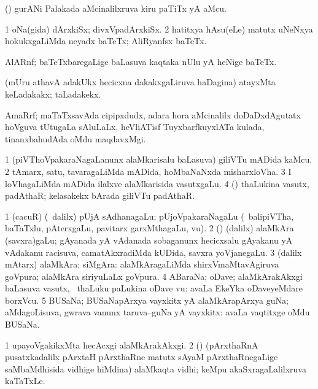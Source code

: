 \bentry
{}
\gl{\nA}
\bmng
(\vaMlAM) gurANi Palakada aMcinalilxruva kiru paTiTx yA aMcu. 
\emng
\eentry

\bentry
{}
\gl{\nA}
\bmng
\bnum
\num{1} oNa(gida) dArxkiSx; divxVpadArxkiSx. 
\num{2} hatitxya hAsu(eLe) matutx uNeNxya hokukxgaLiMda neyadx baTeTx; AliRyanfsx baTeTx. 
\enum
\emng
\eentry

\bentry
{}
\gl{\nA}
\expl{\P}
\bmng
AlARnf; baTeTxbaregaLige baLasuva kaqtaka nUlu yA heNige baTeTx. 
\emng
\eentry

\bentry
{}
\gl{\nA}
\bmng
(mUru athavA adakUkx hecicxna dakakxgaLiruva haDagina) atayxMta keLadakakx; taLadakekx. 
\emng
\eentry

\bentry
{}
\gl{\nA}
\bmng
AmaRrf; maTaTxsavAda cipipxdudx, adara hora aMcinalilx doDaDxdAgutatx hoVguva tUtugaLa sAluLaLx, heVliATisf TuyxbarfkuyxlATa kulada, tinanxbahudAda oMdu maqdavxMgi. 
\emng
\eentry

\bentry
{}
\gl{\nA}
\bmng
\bnum
\num{1} (piVThoVpakaraNagaLanunx alaMkarisalu baLasuva) giliVTu mADida kaMcu. 
\num{2} tAmarx, satu, tavaragaLiMda mADida, hoMbaNaNxda misharxloVha. 
\num{3} I loVhagaLiMda mADida ilalxve alaMkarisida vasutxgaLu. 
\num{4} (\rUpa) thaLukina vasutx, padAthaR; kelasakekx bArada giliVTu padAthaR. 
\enum
\emng
\eentry

\bentry
{}
\gl{\nA}
\bmng
\bnum
\num{1} (cacuR) (\sA\ \bava dalilx) pUjA sAdhanagaLu; pUjoVpakaraNagaLu (\udA\ balipiVTha, baTaTxlu, pAterxgaLu, pavitarx garxMthagaLu, \mo vu). 
\num{2} (\saM) (\bava dalilx) alaMkAra (savxra)gaLu; gAyanada yA vAdanada sobaganunx hecicxsalu gAyakanu yA vAdakanu racisuva, camatAkxradiMda kUDida, savxra yoVjanegaLu. 
\num{3} (\Eva dalilx mAtarx) alaMkAra; siMgAra:  alaMkAragaLiMda shirxVmaMtavAgiruva goVpura; alaMkAra siriyuLaLx goVpura. 
\num{4} ABaraNa; oDave; alaMkArakAkxgi baLasuva vasutx, \kanmu\ thaLuku paLukina oDave \mo vu:  avaLa EkeYka oDaveyeMdare borxVcu. 
\num{5} BUSaNa; BUSaNapArxya vayxkitx yA alaMkArapArxya guNa; aMdagoLisuva, gwrava \mo vanunx taruva--guNa yA vayxkitx:  avaLa vaqtitxge oMdu BUSaNa. 
\enum
\emng

\noindent
\gl{\pagu}
\bmng
\bnum
\num{1}  upayoVgakikxMta hecAcxgi alaMkArakAkxgi. 
\num{2}  (\kerxY) (pArxthaRnA pusatxkadalilx pArxtaH pArxthaRne matutx sAyaM pArxthaRnegaLige saMbaMdhisida vidhige hiMdina) alaMkaqta vidhi; keMpu akaSxragaLalilxruva kaTaTxLe. 
\enum
\emng
\eentry

